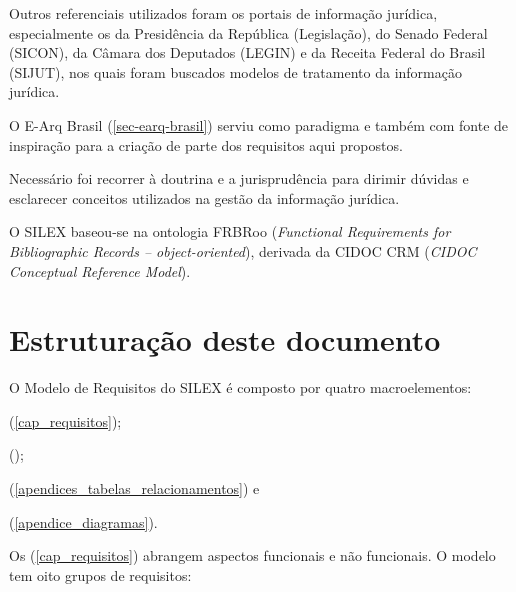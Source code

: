 \documentclass[a4paper,11pt,openright,twoside,brazil]{abntex2}
\begin{document}
Outros referenciais utilizados foram os portais de informação jurídica,
especialmente os da Presidência da República (Legislação), do Senado Federal
(SICON), da Câmara dos Deputados (LEGIN) e da Receita Federal do Brasil (SIJUT),
nos quais foram buscados modelos de tratamento da informação jurídica.

O E-Arq Brasil (\autoref{sec-earq-brasil}) serviu como paradigma e também com
fonte de inspiração para a criação de parte dos requisitos aqui propostos.

Necessário foi recorrer à doutrina e a jurisprudência para dirimir dúvidas e
esclarecer conceitos utilizados na gestão da informação jurídica.

O SILEX baseou-se na ontologia FRBRoo (\emph{Functional Requirements for
Bibliographic Records – object-oriented}), derivada da CIDOC CRM (\emph{CIDOC
Conceptual Reference Model}).

\section{Estruturação deste documento}

O Modelo de Requisitos do SILEX é composto por quatro macroelementos:
\begin{alineas}
  \item {} (\autoref{cap_requisitos});
  
  \item \hyperref[cap_glossario]{\glossaryname} ();
  
  \item {}
  (\autoref{apendices_tabelas_relacionamentos}) e
  
  \item {}
  (\autoref{apendice_diagramas}).
\end{alineas}


Os  (\autoref{cap_requisitos}) abrangem aspectos
funcionais e não funcionais. O modelo tem oito grupos de requisitos: 
\end{document}
